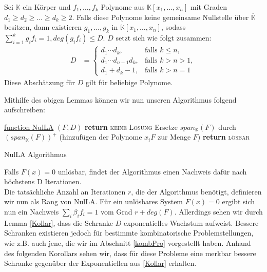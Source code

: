\begin{lemma} \label{Kollar}
Sei $\mathbb{K}$ ein Körper und $f_1,\ldots,f_k$ Polynome aus $\mathbb{K}[x_1,\ldots,x_n]$ mit Graden $d_1\ge d_2 \ge \ldots \ge d_k \ge 2$. Falls diese Polynome keine gemeinsame Nullstelle über $\overline{\mathbb{K}}$ besitzen, dann existieren $g_1,\ldots,g_k$ in $\mathbb{K}[x_1,\ldots,x_n]$, sodass $\sum_{i=1}^k g_if_i=1, deg(g_if_i) \le D$. $D$ setzt sich wie folgt zusammen:
\begin{align}
D &= \begin{cases} d_1\cdots d_k, & \text{falls $k \le n$}, \\ d_1\cdots d_{n-1}d_k, &
  \text{falls $k > n > 1$}, \\ d_1+d_k-1, & \text{falls $k > n = 1$} \end{cases}
\end{align} 
Diese Abschätzung für $D$ gilt für beliebige Polynome.
\end{lemma}

\noindent Mithilfe des obigen Lemmas können wir nun unseren Algorithmus folgend aufschreiben:\\
\begin{algorithm} [H]

    \underline{function NulLA} $(F,D)$\;
		 {
      {
        \textbf{return} \textsc{keine Lösung}\;
      }
      {
        Ersetze $span_\mathbb{K}(F)$ durch $(span_\mathbb{K}(F))^+$ (hinzufügen der Polynome $x_iF$ zur Menge $F$)\;
      }
		}
		\textbf{return} \textsc{lösbar}
    \caption{NulLA Algorithmus}
\end{algorithm}

\noindent Falls $F(x)=0$ unlösbar, findet der Algorithmus einen Nachweis dafür nach höchstens D Iterationen. \\
Die tatsächliche Anzahl an Iterationen $r$, die der Algorithmus benötigt, definieren wir nun als Rang von NulLA. Für ein unlösbares System $F(x)=0$ ergibt sich nun ein Nachweis $\sum_{i} \beta_if_i=1$ vom Grad $r + deg(F)$. Allerdings sehen wir durch Lemma \ref{Kollar}, dass die Schranke $D$ exponentielles Wachstum aufweist. Bessere Schranken existieren jedoch für bestimmte kombinatorische Problemstellungen, wie z.B. auch jene, die wir im Abschnitt \ref{kombPro} vorgestellt haben. Anhand des folgenden Korollars sehen wir, dass für diese Probleme eine merkbar bessere Schranke gegenüber der Exponentiellen aus \ref{Kollar} erhalten. 

